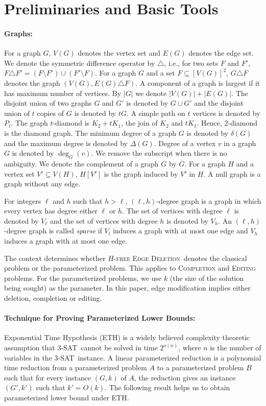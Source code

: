 \documentclass[envcountsame,envcountsect,10pt,oribibl]{llncs}
\newcommand{\pname}[1]{\textnormal{\textsc{#1}}}
\newcommand{\HED}{\pname{$H$-free Edge Deletion}}
\newcommand{\TSAT}{\pname{3-SAT}}
\newcommand{\edges}[1][V]{\left[#1\right]^2}
\begin{document}
\section{Preliminaries and Basic Tools}
\label{sec:prebasics}

\paragraph{\textbf{Graphs:}}

For a graph $G$, $V(G)$ denotes the vertex set and 
$E(G)$ denotes the edge set. We denote the symmetric
difference operator by $\triangle$, i.e., for two sets $F$ and $F'$,
$F\triangle F'=(F\setminus F') \cup (F'\setminus F)$.
For a graph $G$ and a set $F\subseteq \edges[V(G)]$, $G\triangle F$
denotes the graph $(V(G),E(G)\triangle F)$. A component of a graph is largest
if it has maximum number of vertices. By $|G|$ we denote $|V(G)|+|E(G)|$.
The disjoint union of two graphs $G$ and $G'$ is denoted by $G\cup G'$
and the disjoint union of $t$ copies of $G$ is denoted by $tG$.
A simple path on $t$ vertices is denoted by $P_t$.
The graph $t$-diamond is $K_2+tK_1$, the join of $K_2$ and $tK_1$. 
Hence, $2$-diamond is the diamond graph.
The minimum degree of a graph $G$ is denoted by $\delta(G)$
and the maximum degree is denoted by $\Delta(G)$.
Degree of a vertex $v$ in a graph $G$ is denoted by $\deg_G(v)$.
We remove the subscript when there is no ambiguity.
We denote the complement of a graph $G$ by $\overline{G}$.
For a graph $H$ and a vertex set $V'\subseteq V(H)$,
$H[V']$ is the graph induced by $V'$ in $H$.
A null graph is a graph without any edge.

For integers $\ell$ and $h$ such that $h>\ell$, $(\ell,h)$-degree graph is a graph in which 
every vertex has degree either $\ell$ or $h$. The set of vertices with degree $\ell$
is denoted by $V_{\ell}$ and the set of vertices with degree $h$ is denoted by $V_h$. 
An $(\ell,h)$-degree graph is called \emph{sparse} if $V_l$ induces a graph with at most 
one edge and $V_h$ induces a graph with at most one edge.


The context determines whether \HED\ denotes the classical problem or the parameterized
problem. This applies to \textsc{Completion} and \textsc{Editing} problems.
For the parameterized problems, 
we use $k$ (the size of the solution being sought) as the parameter.
In this paper, edge modification implies either deletion, completion or editing.

\paragraph{\textbf{Technique for Proving Parameterized Lower Bounds:}}
Exponential Time Hypothesis (ETH) is a widely believed complexity theoretic
assumption that \TSAT\ 
cannot be solved in time $2^{o(n)}$, where 
$n$ is the number of variables in
the \TSAT\ instance. 
A linear parameterized reduction is a polynomial time reduction
from a parameterized problem $A$ to a parameterized problem $B$
such that for every instance $(G,k)$ of $A$, the reduction gives
an instance $(G',k')$ such that $k'=O(k)$. The following
result helps us to obtain parameterized lower bound under ETH.
\end{document}

